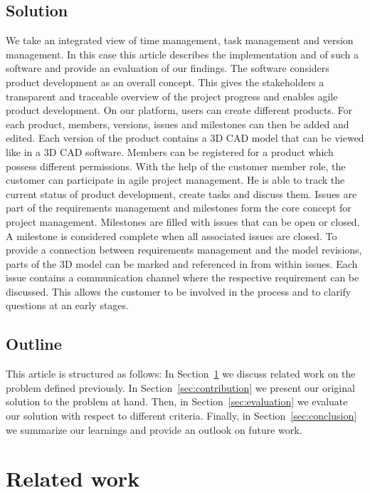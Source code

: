     \subsection*{Solution}
    We take an integrated view of time management, task management and version management. In this case this article describes the implementation and of such a software and provide an evaluation of our findings.
    The software considers product development as an overall concept. This gives the stakeholders a transparent and traceable overview of the project progress and enables agile product development.
    On our platform, users can create different products. For each product, members, versions, issues and milestones can then be added and edited. Each version of the product contains a 3D CAD model that can be viewed like in a 3D CAD software. Members can be registered for a product which possess different permissions. 
    With the help of the customer member role, the customer can participate in agile project management.
    He is able to track the current status of product development, create tasks and discuss them.
    Issues are part of the requirements management and milestones form the core concept for project management.
    Milestones are filled with issues that can be open or closed. A milestone is considered complete when all associated issues are closed.
    To provide a connection between requirements management and the model revisions, parts of the 3D model can be marked and referenced in from within issues.
    Each issue contains a communication channel where the respective requirement can be discussed. This allows the customer to be involved in the process and to clarify questions at an early stages.

    \subsection*{Outline}
    This article is structured as follows:
    In Section~\ref{sec:differentiation} we discuss related work on the problem defined previously.
    In Section~\ref{sec:contribution} we present our original solution to the problem at hand.
    Then, in Section~\ref{sec:evaluation} we evaluate our solution with respect to different criteria.
    Finally, in Section~\ref{sec:conclusion} we summarize our learnings and provide an outlook on future work.
    
    \section{Related work}
    \label{sec:differentiation}


